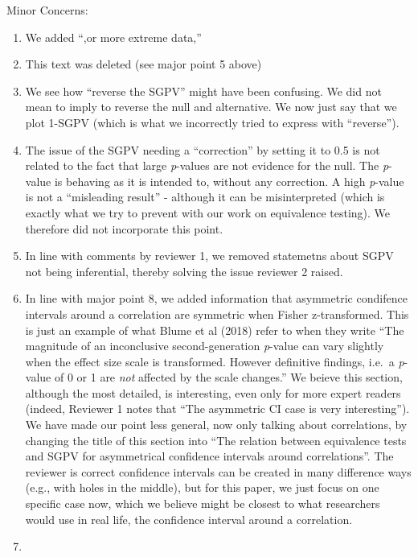 \documentclass[man]{apa6}
\begin{document}
Minor Concerns:

\begin{enumerate}
\def\labelenumi{\arabic{enumi}.}
\item
  We added \enquote{,or more extreme data,}
\item
  This text was deleted (see major point 5 above)
\item
  We see how \enquote{reverse the SGPV} might have been confusing. We did not mean to imply to reverse the null and alternative. We now just say that we plot 1-SGPV (which is what we incorrectly tried to express with \enquote{reverse}).
\item
  The issue of the SGPV needing a \enquote{correction} by setting it to 0.5 is not related to the fact that large \emph{p}-values are not evidence for the null. The \emph{p}-value is behaving as it is intended to, without any correction. A high \emph{p}-value is not a \enquote{misleading result} - although it can be misinterpreted (which is exactly what we try to prevent with our work on equivalence testing). We therefore did not incorporate this point.
\item
  In line with comments by reviewer 1, we removed statemetns about SGPV not being inferential, thereby solving the issue reviewer 2 raised.
\item
  In line with major point 8, we added information that asymmetric condifence intervals around a correlation are symmetric when Fisher z-transformed. This is just an example of what Blume et al (2018) refer to when they write \enquote{The magnitude of an inconclusive second-generation \emph{p}-value can vary slightly when the effect size scale is transformed. However definitive findings, i.e.~a \emph{p}-value of 0 or 1 are \emph{not} affected by the scale changes.} We beieve this section, although the most detailed, is interesting, even only for more expert readers (indeed, Reviewer 1 notes that \enquote{The asymmetric CI case is very interesting}). We have made our point less general, now only talking about correlations, by changing the title of this section into \enquote{The relation between equivalence tests and SGPV for asymmetrical confidence intervals around correlations}. The reviewer is correct confidence intervals can be created in many difference ways (e.g., with holes in the middle), but for this paper, we just focus on one specific case now, which we believe might be closest to what researchers would use in real life, the confidence interval around a correlation.
\item

\end{enumerate}
\end{document}
